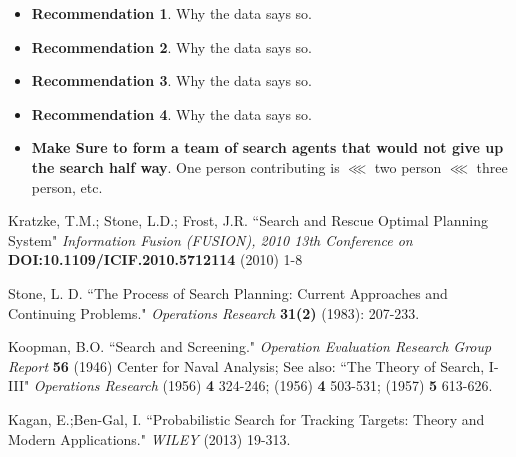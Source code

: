 \documentclass[12pt, letterpaper]{article}  %
\theoremstyle{definition}
\theoremstyle{remark}
\theoremstyle{plain}
\begin{document}


\begin{itemize}
\item \textbf{Recommendation 1}.  Why the data says so.
\item \textbf{Recommendation 2}.  Why the data says so.
\item \textbf{Recommendation 3}.  Why the data says so.
\item \textbf{Recommendation 4}.  Why the data says so.
\item \textbf{Make Sure to form a team of search agents that would not give up the search half way}.  One person contributing is $\lll$ two person $\lll$ three person, etc.
\end{itemize}







\begin{thebibliography}{99}





 Kratzke, T.M.; Stone, L.D.; Frost, J.R. ``Search and Rescue Optimal Planning System" \emph{Information Fusion (FUSION), 2010 13th Conference on} \textbf{DOI:10.1109/ICIF.2010.5712114} 
(2010) 1-8 

  Stone, L. D.  ``The Process of Search Planning: Current Approaches and Continuing Problems."  \emph{Operations Research} \textbf{31(2)} (1983): 207-233.

  Koopman, B.O.  ``Search and Screening."  \emph{Operation Evaluation Research Group Report} \textbf{56} (1946) Center for Naval Analysis; See also: ``The Theory of Search, I-III" \emph{Operations Research} (1956) \textbf{4} 324-246; (1956) \textbf{4} 503-531;  (1957) \textbf{5} 613-626. 

  Kagan, E.;Ben-Gal, I.  ``Probabilistic Search for Tracking Targets: Theory and Modern Applications."  \emph{WILEY} (2013) 19-313.



\end{thebibliography}
\end{document}
